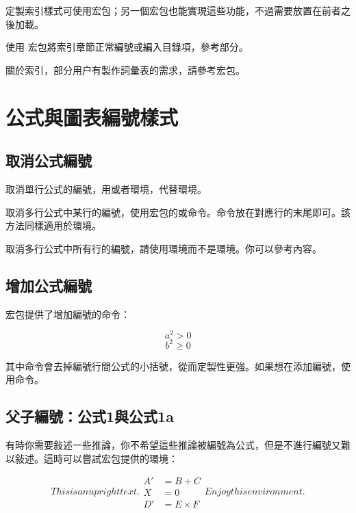 定製索引樣式可使用宏包；另一個宏包也能實現這些功能，不過需要放置在前者之後加載。

使用  宏包將索引章節正常編號或編入目錄項，參考部分。

關於索引，部分用户有製作詞彙表的需求，請參考宏包。

\section{公式與圖表編號樣式}
\subsection{取消公式編號}
取消單行公式的編號，用\latexline{[\char`\\]}或者環境，代替環境。

取消多行公式中某行的編號，使用宏包的或命令。命令放在對應行的末尾即可。該方法同樣適用於環境。

取消多行公式中所有行的編號，請使用環境而不是環境。你可以參考內容。

\subsection{增加公式編號}
宏包提供了增加編號的命令：

\begin{codeshow}
\[a^2>0 \tag{$\star$}\]
\begin{equation}
b^2 \geqslant 0
\tag*{[Axiom]}
\end{equation}
\end{codeshow}

其中命令會去掉編號行間公式的小括號，從而定製性更強。如果想在添加編號，使用命令。

\subsection{父子編號：公式1與公式1a}
有時你需要敍述一些推論，你不希望這些推論被編號為公式，但是不進行編號又難以敍述。這時可以嘗試宏包提供的環境：

\begin{codeshow}
\begin{subequations}
This is an upright text.
\begin{align}
A' &=B+C \\
X &=0 \nonumber \\
D' &=E \times F
\end{align}
Enjoy this environment.
\end{subequations}
\end{codeshow}

